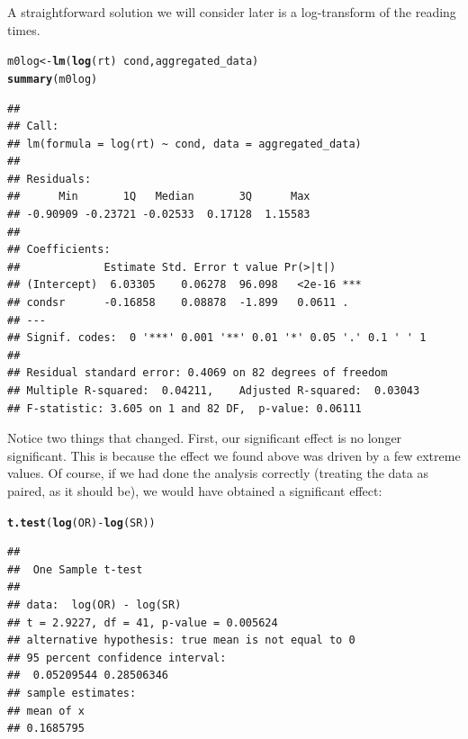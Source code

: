 \documentclass[12pt]{book}\usepackage[]{graphicx}\usepackage[]{color}
\makeatletter
\newcommand{\hlopt}[1]{\textcolor[rgb]{0,0,0}{#1}}%
\newcommand{\hlstd}[1]{\textcolor[rgb]{0.345,0.345,0.345}{#1}}%
\newcommand{\hlkwb}[1]{\textcolor[rgb]{0.69,0.353,0.396}{#1}}%
\newcommand{\hlkwd}[1]{\textcolor[rgb]{0.737,0.353,0.396}{\textbf{#1}}}%
\newenvironment{kframe}{%
 \def\at@end@of@kframe{}%
 \ifinner\ifhmode%
  \def\at@end@of@kframe{\end{minipage}}%
  \begin{minipage}{\columnwidth}%
 \fi\fi%
 \def\FrameCommand##1{\hskip\@totalleftmargin \hskip-\fboxsep
 \colorbox{shadecolor}{##1}\hskip-\fboxsep
     \hskip-\linewidth \hskip-\@totalleftmargin \hskip\columnwidth}%
 \MakeFramed {\advance\hsize-\width
   \@totalleftmargin\z@ \linewidth\hsize
   \@setminipage}}%
 {\par\unskip\endMakeFramed%
 \at@end@of@kframe}
\newenvironment{knitrout}{}{} %
\makeatother
\begin{document}
A straightforward solution we will consider later is a log-transform of the reading times.

\begin{knitrout}
\color{fgcolor}\begin{kframe}
\begin{alltt}
\hlstd{m0log}\hlkwb{<-}\hlkwd{lm}\hlstd{(}\hlkwd{log}\hlstd{(rt)}\hlopt{~}\hlstd{cond,aggregated_data)}
\hlkwd{summary}\hlstd{(m0log)}
\end{alltt}
\begin{verbatim}
## 
## Call:
## lm(formula = log(rt) ~ cond, data = aggregated_data)
## 
## Residuals:
##      Min       1Q   Median       3Q      Max 
## -0.90909 -0.23721 -0.02533  0.17128  1.15583 
## 
## Coefficients:
##             Estimate Std. Error t value Pr(>|t|)    
## (Intercept)  6.03305    0.06278  96.098   <2e-16 ***
## condsr      -0.16858    0.08878  -1.899   0.0611 .  
## ---
## Signif. codes:  0 '***' 0.001 '**' 0.01 '*' 0.05 '.' 0.1 ' ' 1
## 
## Residual standard error: 0.4069 on 82 degrees of freedom
## Multiple R-squared:  0.04211,	Adjusted R-squared:  0.03043 
## F-statistic: 3.605 on 1 and 82 DF,  p-value: 0.06111
\end{verbatim}
\end{kframe}
\end{knitrout}

Notice two things that changed. First, our significant effect is no longer significant.
This is because the effect we found above was driven by a few extreme values. Of course, if we had done the analysis correctly (treating the data as paired, as it should be), we would have obtained a significant effect:

\begin{knitrout}
\color{fgcolor}\begin{kframe}
\begin{alltt}
\hlkwd{t.test}\hlstd{(}\hlkwd{log}\hlstd{(OR)}\hlopt{-}\hlkwd{log}\hlstd{(SR))}
\end{alltt}
\begin{verbatim}
## 
## 	One Sample t-test
## 
## data:  log(OR) - log(SR)
## t = 2.9227, df = 41, p-value = 0.005624
## alternative hypothesis: true mean is not equal to 0
## 95 percent confidence interval:
##  0.05209544 0.28506346
## sample estimates:
## mean of x 
## 0.1685795
\end{verbatim}
\end{kframe}
\end{knitrout}
\end{document}
